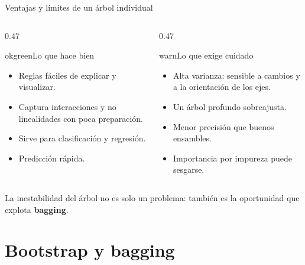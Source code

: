 \documentclass[aspectratio=169,11pt,table]{beamer}
\begin{document}
\begin{frame}{Ventajas y límites de un árbol individual}
\footnotesize
\begin{columns}[T,onlytextwidth]
\begin{column}{0.47\textwidth}
\begin{contrastbox}{okgreen}{Lo que hace bien}
\footnotesize
\begin{itemize}
  \item Reglas fáciles de explicar y visualizar.
  \item Captura interacciones y no linealidades con poca preparación.
  \item Sirve para clasificación y regresión.
  \item Predicción rápida.
\end{itemize}
\end{contrastbox}
\end{column}
\begin{column}{0.47\textwidth}
\begin{contrastbox}{warn}{Lo que exige cuidado}
\footnotesize
\begin{itemize}
  \item Alta varianza: sensible a cambios y a la orientación de los ejes.
  \item Un árbol profundo sobreajusta.
  \item Menor precisión que buenos ensambles.
  \item Importancia por impureza puede sesgarse.
\end{itemize}
\end{contrastbox}
\end{column}
\end{columns}
\vspace{0.08cm}
\begin{keybox}
\centering
La inestabilidad del árbol no es solo un problema: también es la oportunidad que explota \textbf{bagging}.
\end{keybox}
\end{frame}

\section{Bootstrap y bagging}
\end{document}

